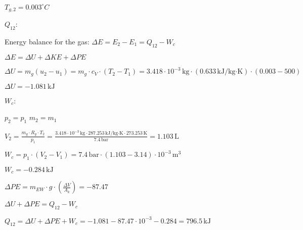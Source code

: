 \( T_{g,2} = 0.003^\circ C \)  

\( Q_{12} \):  

Energy balance for the gas:  
\( \Delta E = E_2 - E_1 = Q_{12} - W_c \)  

\( \Delta E = \Delta U + \Delta KE + \Delta PE \)  

\( \Delta U = m_g (u_2 - u_1) = m_g \cdot c_V \cdot (T_2 - T_1) = 3.418 \cdot 10^{-3} \, \text{kg} \cdot (0.633 \, \text{kJ/kg·K}) \cdot (0.003 - 500) \)  

\( \Delta U = -1.081 \, \text{kJ} \)  

\( W_c \):  

\( p_2 = p_1 \)  
\( m_2 = m_1 \)  

\( V_2 = \frac{m_g \cdot R_g \cdot T_2}{p_1} = \frac{3.418 \cdot 10^{-3} \, \text{kg} \cdot 287.253 \, \text{kJ/kg·K} \cdot 273.253 \, \text{K}}{7.4 \, \text{bar}} = 1.103 \, \text{L} \)  

\( W_c = p_1 \cdot (V_2 - V_1) = 7.4 \, \text{bar} \cdot (1.103 - 3.14) \cdot 10^{-3} \, \text{m}^3 \)  

\( W_c = -0.284 \, \text{kJ} \)  

\( \Delta PE = m_{EW} \cdot g \cdot \left( \frac{\Delta V}{A_k} \right) = -87.47 \)  

\( \Delta U + \Delta PE = Q_{12} - W_c \)  

\( Q_{12} = \Delta U + \Delta PE + W_c = -1.081 - 87.47 \cdot 10^{-3} - 0.284 = 796.5 \, \text{kJ} \)